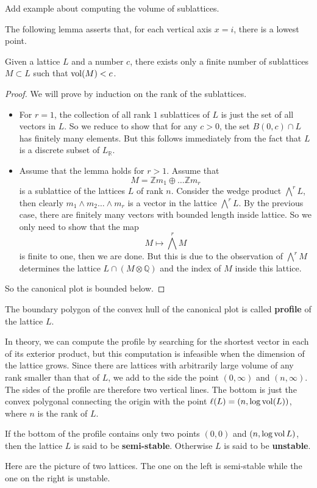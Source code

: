 \begin{example}
    Add example about computing the volume of sublattices.
\end{example}
The following lemma asserts that, for each vertical axis $x =i$, there is a lowest point.
\begin{lemma}
    Given a lattice $L$ and a number $c$, there exists only a finite number of sublattices $M \subset L$ such that
    $\operatorname{vol}(M)<c$.
\end{lemma}
\begin{proof}
    We will prove by induction on the rank of the sublattices.
    \begin{itemize}
        \item For $r =1$, the collection of all rank $1$ sublattices of $L$ is just the set of all vectors in $L$. So we reduce
              to show that for any $c>0$, the set $B(0,c) \cap L$  has finitely many elements. But this follows immediately from the fact that
              $L$ is a discrete subset of $L_\mathbb{R}$.
        \item Assume that the lemma holds for $r >1$. Assume that
              \[M = \mathbb{Z}m_1\oplus \ldots \mathbb{Z}m_r\]
              is a sublattice of the lattices $L$ of rank $n$. Consider the wedge product $\bigwedge^r L$, then clearly
              $m_1\wedge m_2\ldots \wedge m_r$ is a vector in the lattice  $\bigwedge^r L$.
              By the previous case, there are finitely
              many vectors with bounded length inside lattice. So we only need to show that the map
              \[ M \mapsto \bigwedge^r M \]
              is finite to one, then we are done. But this is due to the observation of $\bigwedge^r M$ determines the lattice $L \cap (M \otimes \mathbb{Q})$ and the index of $M$ inside this lattice.
    \end{itemize}
    So the canonical plot is bounded below.
\end{proof}
\begin{definition}
    The boundary polygon of the convex hull of the canonical plot is called \textbf{profile} of the lattice $L$.
\end{definition}
In theory, we can compute the profile by searching for the shortest vector in each of its exterior product, but this computation
is infeasible when the dimension of the lattice grows. Since there are lattices with
arbitrarily large volume of any rank smaller than that of $L$, we add to the side the point $(0,\infty)$ and $(n,\infty)$. The sides
of the profile are therefore two vertical lines. The bottom is just the convex polygonal connecting the origin with the point
$\ell(L) = (n,\log\operatorname{vol}(L))$, where $n$ is the rank of $L$.
\begin{definition}\label{ss1}
    If the bottom of the profile contains only two points $(0,0)$ and $(n,\log\operatorname{vol} L)$, then the
    lattice $L$ is said to be \textbf{semi-stable}. Otherwise $L$ is said to be \textbf{unstable}.
\end{definition}
Here are the picture of two lattices. The one on the left is semi-stable while the one on the right is unstable.

